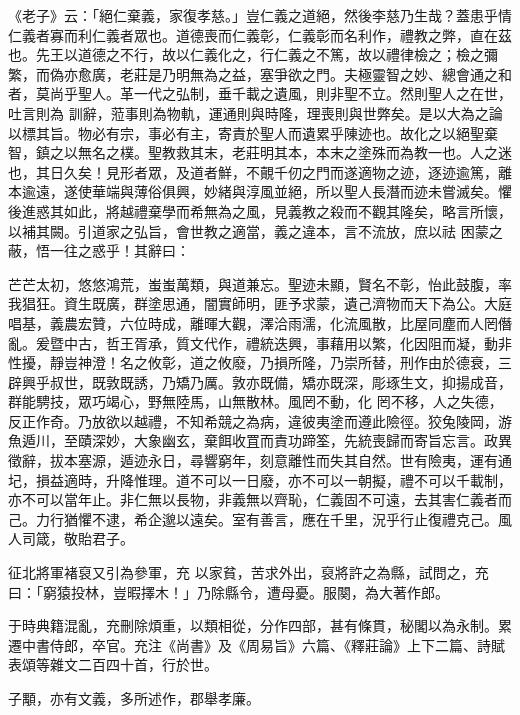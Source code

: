 \begin{pinyinscope}
 《老子》云：「絕仁棄義，家復孝慈。」豈仁義之道絕，然後李慈乃生哉？蓋患乎情仁義者寡而利仁義者眾也。道德喪而仁義彰，仁義彰而名利作，禮教之弊，直在茲也。先王以道德之不行，故以仁義化之，行仁義之不篤，故以禮律檢之；檢之彌繁，而偽亦愈廣，老莊是乃明無為之益，塞爭欲之門。夫極靈智之妙、總會通之和者，莫尚乎聖人。革一代之弘制，垂千載之遺風，則非聖不立。然則聖人之在世，吐言則為
 訓辭，蒞事則為物軌，運通則與時隆，理喪則與世弊矣。是以大為之論以標其旨。物必有宗，事必有主，寄責於聖人而遺累乎陳迹也。故化之以絕聖棄智，鎮之以無名之樸。聖教救其末，老莊明其本，本末之塗殊而為教一也。人之迷也，其日久矣！見形者眾，及道者鮮，不覿千仞之門而遂適物之迹，逐迹逾篤，離本逾遠，遂使華端與薄俗俱興，妙緒與淳風並絕，所以聖人長潛而迹未嘗滅矣。懼後進惑其如此，將越禮棄學而希無為之風，見義教之殺而不觀其隆矣，略言所懷，以補其闕。引道家之弘旨，會世教之適當，義之違本，言不流放，庶以祛
 困蒙之蔽，悟一往之惑乎！其辭曰：



 芒芒太初，悠悠鴻荒，蚩蚩萬類，與道兼忘。聖迹未顯，賢名不彰，怡此鼓腹，率我猖狂。資生既廣，群塗思通，闇實師明，匪予求蒙，遺己濟物而天下為公。大庭唱基，義農宏贊，六位時成，離暉大觀，澤洽雨濡，化流風散，比屋同塵而人罔僭亂。爰暨中古，哲王胥承，質文代作，禮統迭興，事藉用以繁，化因阻而凝，動非性擾，靜豈神澄！名之攸彰，道之攸廢，乃損所隆，乃崇所替，刑作由於德衰，三辟興乎叔世，既敦既誘，乃矯乃厲。敦亦既備，矯亦既深，彫琢生文，抑揚成音，群能騁技，眾巧竭心，野無陸馬，山無散林。風罔不動，化
 罔不移，人之失德，反正作奇。乃放欲以越禮，不知希競之為病，違彼夷塗而遵此險徑。狡兔陵岡，游魚遁川，至賾深妙，大象幽玄，棄餌收罝而責功蹄筌，先統喪歸而寄旨忘言。政異徵辭，拔本塞源，遁迹永日，尋響窮年，刻意離性而失其自然。世有險夷，運有通圮，損益適時，升降惟理。道不可以一日廢，亦不可以一朝擬，禮不可以千載制，亦不可以當年止。非仁無以長物，非義無以齊恥，仁義固不可遠，去其害仁義者而己。力行猶懼不逮，希企邈以遠矣。室有善言，應在千里，況乎行止復禮克己。風人司箴，敬貽君子。



 征北將軍褚裒又引為參軍，充
 以家貧，苦求外出，裒將許之為縣，試問之，充曰：「窮猿投林，豈暇擇木！」乃除縣令，遭母憂。服闋，為大著作郎。



 于時典籍混亂，充刪除煩重，以類相從，分作四部，甚有條貫，秘閣以為永制。累遷中書侍郎，卒官。充注《尚書》及《周易旨》六篇、《釋莊論》上下二篇、詩賦表頌等雜文二百四十首，行於世。



 子顒，亦有文義，多所述作，郡舉孝廉。




\end{pinyinscope}
